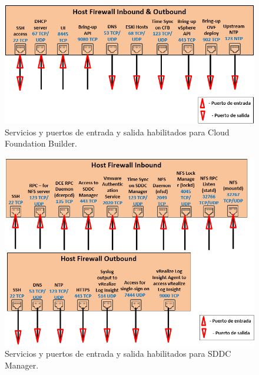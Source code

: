 \begin{figure}[h!]
  \centering
  \includegraphics[width=1\textwidth]{imaxes/conceptosPrevios/firewall_CloudBuilder.png}
  \caption{Servicios y puertos de entrada y salida habilitados para Cloud Foundation Builder.}
  \label{fig:puertosCB}
\end{figure}
\begin{figure}[h!]
  \centering
  \includegraphics[width=1\textwidth]{imaxes/conceptosPrevios/firewall_SDDC.png}
  \caption{Servicios y puertos de entrada y salida habilitados para SDDC Manager.}
  \label{fig:puertosSDDC}
\end{figure}

